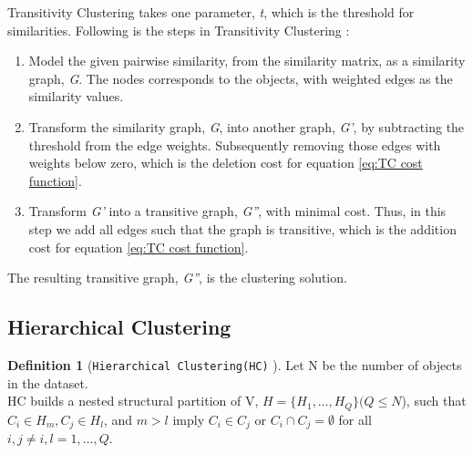 \documentclass[a4paper,10pt]{article}
\theoremstyle{plain}
\theoremstyle{definition}
\newtheorem{defn}{Definition}
\begin{document}

Transitivity Clustering takes one parameter, \textit{t}, which is the threshold for similarities. Following is the steps in Transitivity Clustering \cite{comprehensiveCAwithTC}:
\begin{enumerate}
	\item Model the given pairwise similarity, from the similarity matrix, as a similarity graph, \textit{G}. The nodes corresponds to the objects, with weighted edges as the similarity values.
	
	\item Transform the similarity graph, \textit{G}, into another graph, \textit{G'}, by subtracting the threshold from the edge weights. Subsequently removing those edges with weights below zero, which is the deletion cost for equation \ref{eq:TC cost function}.
	
	\item Transform \textit{G'} into a transitive graph, \textit{G''}, with minimal cost. Thus, in this step we add all edges such that the graph is transitive, which is the addition cost for equation \ref{eq:TC cost function}.
\end{enumerate}
The resulting transitive graph, \textit{G''}, is the clustering solution.


\subsection{Hierarchical Clustering}
\label{sec:hierarhicalClustering}
\begin{defn}[\texttt{Hierarchical Clustering(HC)} \cite{clusteringOverview}]\label{def:hc}
	Let N be the number of objects in the dataset. \\HC builds a nested structural partition of V, $H = \{ H_1, \dots, H_Q \} (Q \leq N$), such that $C_i \in H_m, C_j \in H_l$, and $m > l$ imply $C_i \in C_j$ or $C_i \cap C_j = \emptyset$ for all $i, j \neq i, l = 1, \dots, Q$.
\end{defn}
\end{document}
